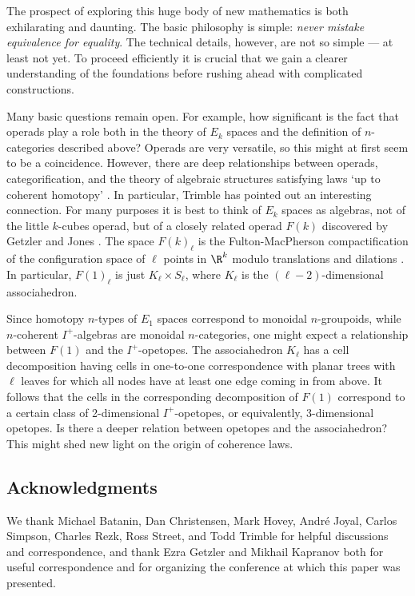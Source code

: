 The prospect of exploring this huge body of new mathematics is both
exhilarating and daunting.  The basic philosophy is simple: {\it never
mistake equivalence for equality}.  The technical details, however, are
not so simple --- at least not yet.  To proceed efficiently it is
crucial that we gain a clearer understanding of the foundations before
rushing ahead with complicated constructions.  

Many basic questions remain open.  For example, how significant is the
fact that operads play a role both in the theory of $E_k$ spaces and the
definition of $n$-categories described above?  Operads are very
versatile, so this might at first seem to be a coincidence.  However,
there are deep relationships between operads, categorification, and the
theory of algebraic structures satisfying laws `up to coherent homotopy'
\cite{Stasheff2}.  In particular, Trimble \cite{Trimble} has pointed out an
interesting connection.  For many purposes it is best to think of $E_k$
spaces as algebras, not of the little $k$-cubes operad, but of a closely
related operad $F(k)$ discovered by Getzler and Jones \cite{GJ}.  
The space $F(k)_\ell$ is the Fulton-MacPherson compactification of 
the configuration space of $\ell$ points in $\R^k$ modulo translations 
and dilations \cite{FM}.  In particular, $F(1)_\ell$ is just 
$K_\ell \times S_\ell$, where $K_\ell$ is the $(\ell - 2)$-dimensional 
associahedron.  

Since homotopy $n$-types of $E_1$ spaces 
correspond to monoidal $n$-groupoids, while $n$-coherent $I^+$-algebras
are monoidal $n$-categories, one might expect a relationship between
$F(1)$ and the $I^+$-opetopes.  The associahedron $K_\ell$ has 
a cell decomposition having cells in one-to-one correspondence with
planar trees with $\ell$ leaves for which all nodes have at least one
edge coming in from above.  It follows that the cells in the corresponding
decomposition of $F(1)$ correspond to a certain class of 2-dimensional
$I^+$-opetopes, or equivalently, 3-dimensional opetopes.  Is there a deeper 
relation between opetopes and the associahedron?  This might shed new 
light on the origin of coherence laws.

\subsection*{Acknowledgments} We thank Michael Batanin, Dan Christensen,
Mark Hovey, Andr\'e Joyal, Carlos Simpson, Charles Rezk, Ross Street,
and Todd Trimble for helpful discussions and correspondence, and thank
Ezra Getzler and Mikhail Kapranov both for useful correspondence and for
organizing the conference at which this paper was presented.

